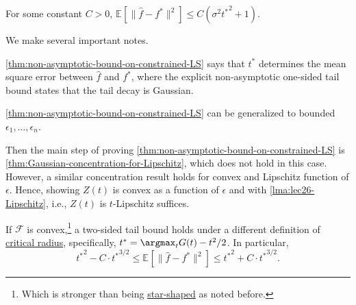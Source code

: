\begin{remark}
	For some constant \(C > 0\), \(\mathbb{E}_{}[ \lVert \hat{f} - f^{\ast} \rVert ^2 ] \leq C (\sigma ^2 {t^{\ast} }^2 + 1)\).
\end{remark}

We make several important notes.

\begin{note}
	\autoref{thm:non-asymptotic-bound-on-constrained-LS} says that \(t^{\ast} \) determines the mean square error between \(\hat{f} \) and \(f^{\ast} \), where the explicit non-asymptotic one-sided tail bound states that the tail decay is Gaussian.
\end{note}

\begin{note}
	\autoref{thm:non-asymptotic-bound-on-constrained-LS} can be generalized to bounded \(\epsilon _1, \dots , \epsilon _n \).
\end{note}
\begin{explanation}
	Then the main step of proving \autoref{thm:non-asymptotic-bound-on-constrained-LS} is \autoref{thm:Gaussian-concentration-for-Lipschitz}, which does not hold in this case. However, a similar concentration result holds for convex and Lipschitz function of \(\epsilon \). Hence, showing \(Z(t)\) is convex as a function of \(\epsilon \) and with \autoref{lma:lec26-Lipschitz}, i.e., \(Z(t)\) is \(t\)-Lipschitz suffices.
\end{explanation}

\begin{remark}
	If \(\mathscr{F} \) is convex,\footnote{Which is stronger than being \hyperref[def:star-shaped]{star-shaped} as noted before.} a two-sided tail bound holds under a different definition of \hyperref[def:critical-radius]{critical radius}, specifically, \(t^{\ast} = \argmax_{t} G(t) - t^2 / 2\). In particular,
	\[
		{t^{\ast} }^2 - C\cdot {t^{\ast} }^{3 / 2}
		\leq \mathbb{E}_{}\left[ \lVert \hat{f} - f^{\ast} \rVert ^2 \right]
		\leq {t^{\ast} }^2 + C\cdot {t^{\ast} }^{3 / 2}.
	\]
\end{remark}